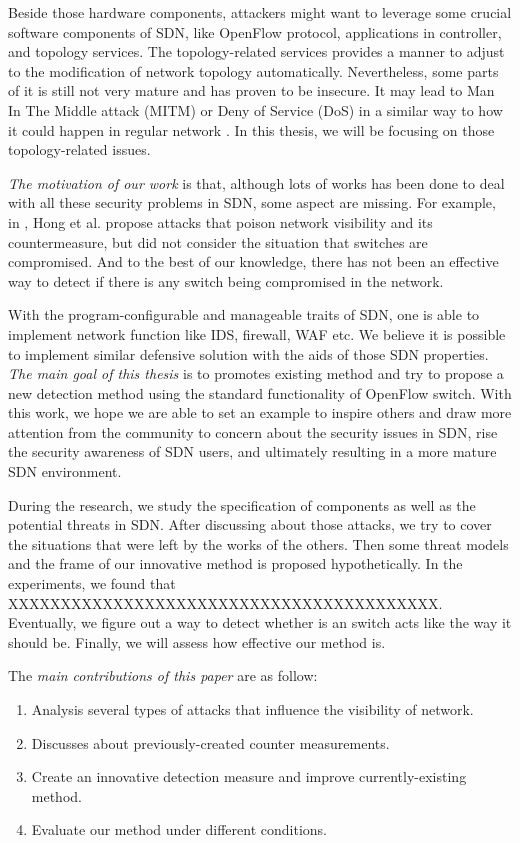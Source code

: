 Beside those hardware components, attackers might want to leverage some crucial software components of SDN, like OpenFlow protocol, applications in controller, and topology services. The topology-related services  provides a manner to adjust to the modification of network topology automatically. Nevertheless, some parts of it is still not very mature and has proven to be insecure. It may lead to Man In The Middle attack (MITM) or Deny of Service (DoS) in a similar way to how it could happen in regular network \cite{ASO}. In this thesis, we will be focusing on those topology-related issues.

\emph{The motivation of our work} is that, although lots of works has been done to deal with all these security problems in SDN, some aspect are missing. For example, in \cite{HXWG_15}, Hong et al. propose attacks that poison network visibility and its countermeasure, but did not consider the situation that switches are compromised. And to the best of our knowledge, there has not been an effective way to detect if there is any switch being compromised in the network. 

With the program-configurable and manageable traits of SDN, one is able to implement network function like IDS, firewall, WAF etc. We believe it is possible to implement similar defensive solution with the aids of those SDN properties. \emph{The main goal of this thesis} is to promotes existing method and try to propose a new detection method using the standard functionality of OpenFlow switch. With this work, we hope we are able to set an example to inspire others and draw more attention from the community to concern about the security issues in SDN, rise the security awareness of SDN users, and ultimately resulting in a more mature SDN environment.

During the research, we study the specification of components as well as the potential threats in SDN. After discussing about those attacks, we try to cover the situations that were left by the works of the others. Then some threat models and the frame of our innovative method is proposed hypothetically. 
In the experiments, we found that XXXXXXXXXXXXXXXXXXXXXXXXXXXXXXXXXXXXXXXXX. Eventually, we figure out a way to detect whether is an switch acts like the way it should be. Finally, we will assess how effective our method is.

The \emph{main contributions of this paper} are as follow:

\begin{enumerate}
\item
Analysis several types of attacks that influence the visibility of network.
\item
Discusses about previously-created counter measurements.
\item
Create an innovative detection measure and improve currently-existing method.
\item
Evaluate our method under different conditions.
\end{enumerate}

